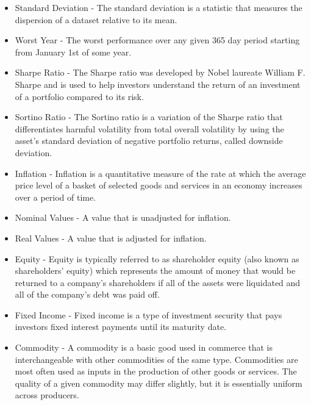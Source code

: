 \documentclass[main.tex]{subfiles}
\begin{document}
\begin{itemize}
    \item Standard Deviation - The standard deviation is a statistic that measures the dispersion of a dataset relative to its mean.
    \item Worst Year - The worst performance over any given 365 day period starting from January 1st of some year.
    \item Sharpe Ratio - The Sharpe ratio was developed by Nobel laureate William F. Sharpe and is used to help investors understand the return of an investment of a portfolio compared to its risk.
\item Sortino Ratio - The Sortino ratio is a variation of the Sharpe ratio that differentiates harmful volatility from total overall volatility by using the asset's standard deviation of negative portfolio returns, called downside deviation.
\item Inflation - Inflation is a quantitative measure of the rate at which the average price level of a basket of selected goods and services in an economy increases over a period of time.
\item Nominal Values - A value that is unadjusted for inflation.
\item Real Values - A value that is adjusted for inflation.
\item Equity - Equity is typically referred to as shareholder equity (also known as shareholders' equity) which represents the amount of money that would be returned to a company’s shareholders if all of the assets were liquidated and all of
the company's debt was paid off.
\item Fixed Income - Fixed income is a type of investment security that pays investors fixed interest payments until its maturity date.
\item Commodity - A commodity is a basic good used in commerce that is interchangeable with other commodities of the same type. Commodities are most often used as inputs in the production of other goods or services. The quality of a given commodity may differ slightly, but it is essentially uniform across producers.

\end{itemize}
\end{document}
